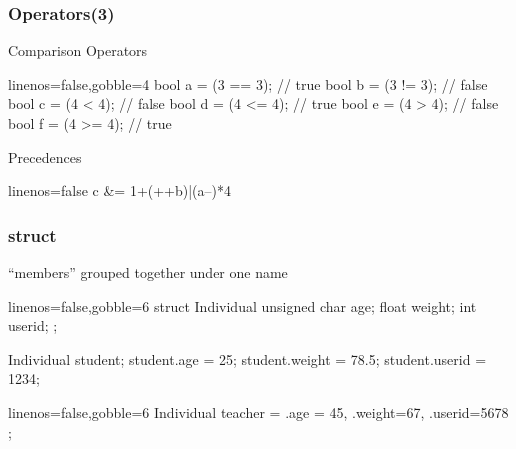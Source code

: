 \begin{frame}[fragile]
  \frametitle{Operators(3)}
  \begin{block}{Comparison Operators}
    \begin{cppcode*}{linenos=false,gobble=4}
      bool a = (3 == 3);  // true
      bool b = (3 != 3);  // false
      bool c = (4 < 4);   // false
      bool d = (4 <= 4);  // true
      bool e = (4 > 4);   // false
      bool f = (4 >= 4);  // true
    \end{cppcode*}
  \end{block}
  \pause
  \begin{block}{Precedences }
    \begin{cppcode*}{linenos=false}
      c &= 1+(++b)|(a--)*4%
    \end{cppcode*}
  \end{block}
\end{frame}

\begin{frame}[fragile]
  \frametitle{struct}
  \begin{mdframed}[style=simplebox]
    \center ``members'' grouped together under one name
  \end{mdframed}
  \begin{multicols}{2}
    \begin{cppcode*}{linenos=false,gobble=6}
      struct Individual {
        unsigned char age;
        float weight;
        int userid;
      };

      Individual student;
      student.age = 25;
      student.weight = 78.5;
      student.userid = 1234;
    \end{cppcode*}
    \pause
    \columnbreak
    \begin{cppcode*}{linenos=false,gobble=6}
      Individual teacher = {
        .age = 45,
        .weight=67,
        .userid=5678 };
    \end{cppcode*}
  \end{multicols}
\end{frame}

